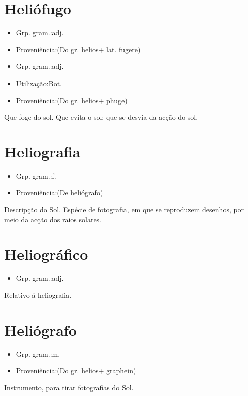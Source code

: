 \documentclass{article}
\begin{document}
\section{Heliófugo}
\begin{itemize}
\item {Grp. gram.:adj.}
\end{itemize}
\begin{itemize}
\item {Proveniência:(Do gr. \textunderscore helios\textunderscore  + lat. \textunderscore fugere\textunderscore )}
\end{itemize}
\begin{itemize}
\item {Grp. gram.:adj.}
\end{itemize}
\begin{itemize}
\item {Utilização:Bot.}
\end{itemize}
\begin{itemize}
\item {Proveniência:(Do gr. \textunderscore helios\textunderscore  + \textunderscore phuge\textunderscore )}
\end{itemize}
Que foge do sol.
Que evita o sol; que se desvia da acção do sol.
\section{Heliografia}
\begin{itemize}
\item {Grp. gram.:f.}
\end{itemize}
\begin{itemize}
\item {Proveniência:(De \textunderscore heliógrafo\textunderscore )}
\end{itemize}
Descripção do Sol.
Espécie de fotografia, em que se reproduzem desenhos, por meio da acção dos raios solares.
\section{Heliográfico}
\begin{itemize}
\item {Grp. gram.:adj.}
\end{itemize}
Relativo á heliografia.
\section{Heliógrafo}
\begin{itemize}
\item {Grp. gram.:m.}
\end{itemize}
\begin{itemize}
\item {Proveniência:(Do gr. \textunderscore helios\textunderscore  + \textunderscore graphein\textunderscore )}
\end{itemize}
Instrumento, para tirar fotografias do Sol.
\end{document}
